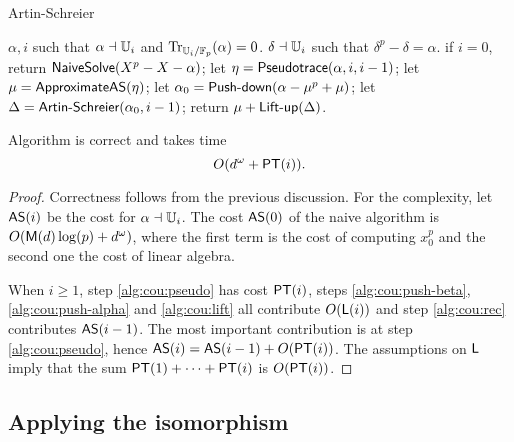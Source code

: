 \begin{algorithm}
  \caption{Artin-Schreier}
  \begin{algorithmic}[1]
    \REQUIRE $\alpha,i$ such that $\alpha\dashv\mathbb{U}_i$ and $\operatorname{Tr}_{\mathbb{U}_i/\mathbb{F}_p}(\alpha)=0$.
    \ENSURE $\delta\dashv\mathbb{U}_i$ such that $\delta^p-\delta=\alpha$.
    \STATE \label{alg:cou:base}if $i=0$, return ${\sf NaiveSolve}(X^p-X-\alpha)$;
    \STATE \label{alg:cou:pseudo} let $\eta = {\sf Pseudotrace}(\alpha, i,i-1)$;
    \STATE \label{alg:cou:push-beta} let $\mu= {\sf ApproximateAS}(\eta)$;
    \STATE \label{alg:cou:push-alpha} let $\alpha_0=\text{{\sf Push-down}}(\alpha-\mu^p+\mu)$;
    \STATE \label{alg:cou:rec} let $\Delta =\text{{\sf Artin-Schreier}}(\alpha_0,i-1)$;
    \STATE \label{alg:cou:lift} return $\mu+\text{{\sf Lift-up}}(\Delta)$.
  \end{algorithmic}
\end{algorithm}

\begin{theorem}\label{theo:AS}
  Algorithm  is correct and takes time 
  \begin{equation}
    \label{eq:109}
    O(d^\omega + \mathsf{PT}(i))
    \text{.}
  \end{equation}
\end{theorem}
\begin{proof} 
  Correctness follows from the previous discussion.  For the
  complexity, let ${\sf AS}(i)$ be the cost for $\alpha\dashv\mathbb{U}_i$. The
  cost ${\sf AS}(0)$ of the naive algorithm is $O(\mathsf{M}(d)\log(p) +
  d^\omega)$, where the first term is the cost of computing $x_0^p$
  and the second one the cost of linear algebra.

  When $i\ge1$, step \ref{alg:cou:pseudo} has cost $\mathsf{PT}(i)$, steps
  \ref{alg:cou:push-beta}, \ref{alg:cou:push-alpha} and
  \ref{alg:cou:lift} all contribute $O(\mathsf{L}(i))$ and step
  \ref{alg:cou:rec} contributes ${\sf AS}(i-1)$. The most important
  contribution is at step \ref{alg:cou:pseudo}, hence ${\sf AS}(i) =
  {\sf AS}(i-1) + O(\mathsf{PT}(i))$. The assumptions on $\mathsf{L}$ imply that
  the sum $\mathsf{PT}(1) + \cdots + \mathsf{PT}(i)$ is $O(\mathsf{PT}(i))$.
\end{proof}


\subsection{Applying the isomorphism}

